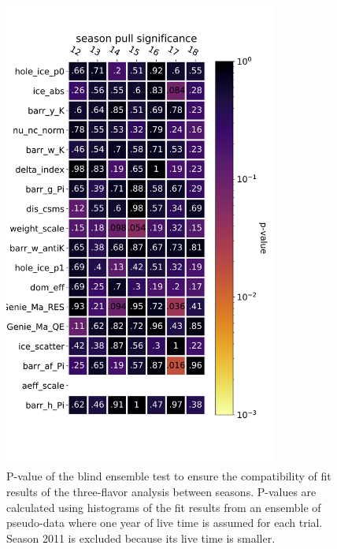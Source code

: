\begin{figure}
    \centering
    \includegraphics[width=0.8\textwidth]{figures/measurement/three_flavor/seasonal_stability/blind_ensemble_seasons_12-18_p-values.png}
    \caption{P-value of the blind ensemble test to ensure the compatibility of fit results of the three-flavor analysis between seasons. P-values are calculated using histograms of the fit results from an ensemble of pseudo-data where one year of live time is assumed for each trial. Season 2011 is excluded because its live time is smaller.\label{fig:pval-nuisance-parameter-ensemble}}
\end{figure}
